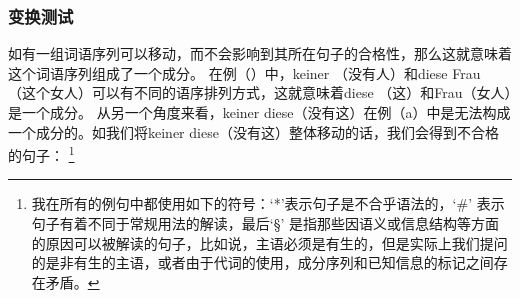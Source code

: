 \subsubsection{变换测试}
如有一组词语序列可以移动，而不会影响到其所在句子的合格性，那么这就意味着这个词语序列组成了一个成分。
在例（）中，keiner （没有人）和diese Frau （这个女人）可以有不同的语序排列方式，这就意味着diese （这）和Frau（女人）是一个成分。
\eal
{}
\zl
从另一个角度来看，keiner diese（没有这）在例（a）中是无法构成一个成分的。如我们将keiner diese（没有这）整体移动的话，我们会得到不合格的句子：
\footnote{我在所有的例句中都使用如下的符号：`*'\is{*}\isc{*}表示句子是不合乎语法的，`\#'\is{\#}\isc{\#} 表示句子有着不同于常规用法的解读，最后`\S'\is{\S}\isc{\S} 是指那些因语义或信息结构等方面的原因可以被解读的句子，比如说，主语必须是有生的，但是实际上我们提问的是非有生的主语，或者由于代词的使用，成分序列和已知信息的标记之间存在矛盾。 }
 \eal
{}
\zl

